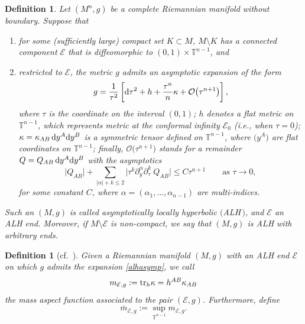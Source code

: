 \documentclass[10pt,a4paper]{amsart}
\numberwithin{equation}{section}
\newtheorem{Definition}[Theorem]{Definition}
\def\tr{{\rm tr}}
\def\T{\mathbb{T}}
\def\Ecal{\mathcal{E}}
\def\Ocal{\mathcal{O}}
\def\ed{{\rm d}}
\def\tr{{\rm tr}}
\begin{document}
\begin{Definition}\label{alh}
Let $(M^n,g)$ be a complete Riemannian manifold without boundary.
Suppose that
\begin{enumerate}\itemsep=0pt
    \item[$(1)$] for some (sufficiently large)
		compact set $K\subset M$, $M\setminus K$ has a connected component $\Ecal$
		that is diffeomorphic to $(0, 1)\times \mathbb{T}^{n-1}$, and
	\item[$(2)$] restricted to $\Ecal$, the metric $g$ admits an asymptotic expansion of the form
	\begin{equation}\label{alhasymp}
	g=\frac{1}{\tau^2}\left[\ed \tau^2+h+\frac{\tau^n}{n} \kappa +\Ocal\big(\tau^{n+1}\big)\right],
	\end{equation}
	where $\tau$ is the coordinate on the interval $(0,1)$; $h$ denotes a flat metric on $\mathbb{T}^{n-1} $, which represents metric at the conformal infinity $\Ecal_0$ (i.e., when $\tau = 0$); $\kappa=\kappa_{AB}\,\ed y^A \ed y^B$ is a symmetric tensor defined on $\T^{n-1}$, where $\bigl(y^A\bigr)$ are flat coordinates on $\T^{n-1}$; finally, $ \Ocal\bigl(\tau^{n+1}\bigr)$ stands for a remainder $Q = Q_{AB}\,\ed y^A\ed y^B$ with the asymptotics
	\begin{equation*}%
		\bigl|Q_{AB}\bigr| + \sum_{|\alpha|+k\le 2}\bigl|\tau^k\partial_y^\alpha \partial_\tau^k\  Q_{AB}\bigr| \le C\tau^{n+1} \qquad \mbox{as } \tau\rightarrow 0,
	\end{equation*}
	for some constant $C$, where $\alpha = (\alpha_1,\ldots, \alpha_{n-1})$ are multi-indices.
	\end{enumerate}
Such an $(M,g)$ is called \emph{asymptotically locally hyperbolic $($ALH\,$)$}, and $\Ecal$
 an \emph{ALH end}. Moreover, if $M\setminus \Ecal$ is non-compact,
we say that $(M,g)$ is \emph{ALH with arbitrary ends}.
\end{Definition}

\begin{Definition}[{cf.~\cite[Definition 1.1]{LN2015}}]\label{massDef}
Given a Riemannian manifold $(M,g)$ with an ALH end $\Ecal$ on which $g$ admits
the expansion \eqref{alhasymp}, we call
 \begin{equation*}%
 	m_{\Ecal,g}:=\tr_{h}\kappa =h^{AB} \kappa_{AB}
 \end{equation*}
the \emph{mass aspect function} associated to the pair $(\Ecal,g)$.
Furthermore, define
 \begin{equation*}%
 \bar m_{\Ecal,g} :=\sup_{\mathbb{T}^{n-1}} m_{\Ecal,g}.
 \end{equation*}
 \end{Definition}
\end{document}
